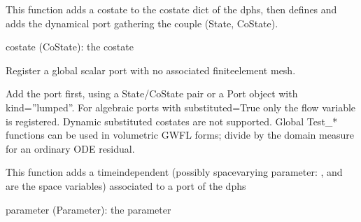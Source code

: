 \documentclass[letterpaper,10pt,english]{sphinxmanual}
\begin{document}
\begin{fulllineitems}

\begin{fulllineitems}
\label{\detokenize{scrimp:scrimp.dphs.DPHS.add_costate}}
\pysigstartsignatures
\pysiglinewithargsret
{}
{}
{}
\pysigstopsignatures
\sphinxAtStartPar
This function adds a costate to the costate dict of the dphs, then defines and adds the dynamical port gathering the couple (State, CoState).
\begin{description}
\sphinxAtStartPar
costate (CoState): the costate

\end{description}

\end{fulllineitems}


\begin{fulllineitems}
\label{\detokenize{scrimp:scrimp.dphs.DPHS.add_lumped_port}}
\pysigstartsignatures
\pysiglinewithargsret
{}
{}
{}
\pysigstopsignatures
\sphinxAtStartPar
Register a global scalar port with no associated finite\sphinxhyphen{}element mesh.

\sphinxAtStartPar
Add the port first, using a State/CoState pair or a Port object with
kind=”lumped”. For algebraic ports with substituted=True only the
flow variable is registered. Dynamic substituted co\sphinxhyphen{}states are not
supported. Global Test\_* functions can be used in volumetric GWFL
forms; divide by the domain measure for an ordinary ODE residual.

\end{fulllineitems}


\begin{fulllineitems}
\label{\detokenize{scrimp:scrimp.dphs.DPHS.add_parameter}}
\pysigstartsignatures
\pysiglinewithargsret
{}
{}
{}
\pysigstopsignatures
\sphinxAtStartPar
This function adds a time\sphinxhyphen{}independent (possibly space\sphinxhyphen{}varying parameter: ,  and  are the space variables) associated to a port of the dphs
\begin{description}
\sphinxAtStartPar
parameter (Parameter): the parameter


\end{description}
\end{fulllineitems}
\end{fulllineitems}
\end{document}
